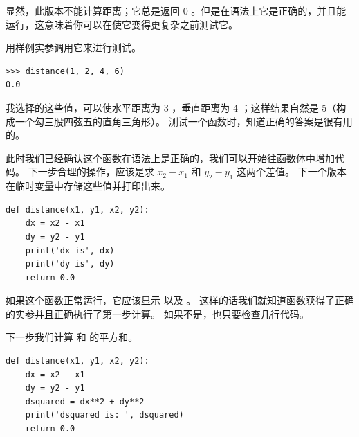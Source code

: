 显然，此版本不能计算距离；它总是返回 0 。但是在语法上它是正确的，并且能运行，这意味着你可以在使它变得更复杂之前测试它。


用样例实参调用它来进行测试。

\begin{lstlisting}
>>> distance(1, 2, 4, 6)
0.0
\end{lstlisting}

%

我选择的这些值，可以使水平距离为 3 ，垂直距离为 4 ；这样结果自然是 5（构成一个勾三股四弦五的直角三角形）。 测试一个函数时，知道正确的答案是很有用的。


此时我们已经确认这个函数在语法上是正确的，我们可以开始往函数体中增加代码。
下一步合理的操作，应该是求 $x_2 - x_1$ 和 $y_2 - y_1$ 这两个差值。
下一个版本在临时变量中存储这些值并打印出来。

\begin{lstlisting}
def distance(x1, y1, x2, y2):
    dx = x2 - x1
    dy = y2 - y1
    print('dx is', dx)
    print('dy is', dy)
    return 0.0
\end{lstlisting}

%

如果这个函数正常运行，它应该显示   以及  。
这样的话我们就知道函数获得了正确的实参并且正确执行了第一步计算。
如果不是，也只要检查几行代码。


下一步我们计算  和  的平方和。

\begin{lstlisting}
def distance(x1, y1, x2, y2):
    dx = x2 - x1
    dy = y2 - y1
    dsquared = dx**2 + dy**2
    print('dsquared is: ', dsquared)
    return 0.0
\end{lstlisting}


